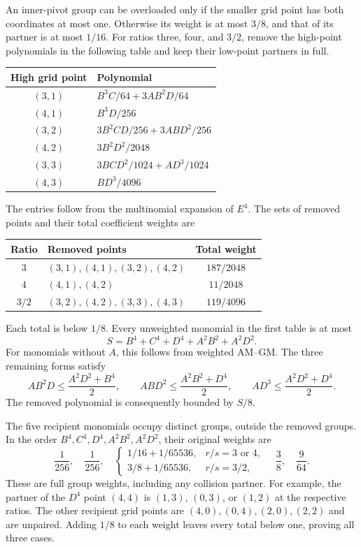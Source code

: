 An inner-pivot group can be overloaded only if the smaller grid point has
both coordinates at most one.  Otherwise its weight is at most $3/8$,
and that of its partner is at most $1/16$.
For ratios three, four, and $3/2$, remove the high-point polynomials in
the following table and keep their low-point partners in full.
\begin{center}
\begin{tabular}{cl}
\toprule
High grid point & Polynomial \\
\midrule
$(3,1)$ & $B^3C/64+3AB^2D/64$ \\
$(4,1)$ & $B^3D/256$ \\
$(3,2)$ & $3B^2CD/256+3ABD^2/256$ \\
$(4,2)$ & $3B^2D^2/2048$ \\
$(3,3)$ & $3BCD^2/1024+AD^3/1024$ \\
$(4,3)$ & $BD^3/4096$ \\
\bottomrule
\end{tabular}
\end{center}
The entries follow from the multinomial expansion of $E^4$.  The sets
of removed points and their total coefficient weights are
\begin{center}
\begin{tabular}{clc}
\toprule
Ratio & Removed points & Total weight \\
\midrule
$3$ & $(3,1),(4,1),(3,2),(4,2)$ & $187/2048$ \\
$4$ & $(4,1),(4,2)$ & $11/2048$ \\
$3/2$ & $(3,2),(4,2),(3,3),(4,3)$ & $119/4096$ \\
\bottomrule
\end{tabular}
\end{center}
Each total is below $1/8$.  Every unweighted monomial in the first table
is at most
\[
 S=B^4+C^4+D^4+A^2B^2+A^2D^2.
\]
For monomials without $A$, this follows from weighted AM--GM.  The three
remaining forms satisfy
\[
 AB^2D\le\frac{A^2D^2+B^4}{2},\qquad
 ABD^2\le\frac{A^2B^2+D^4}{2},\qquad
 AD^3\le\frac{A^2D^2+D^4}{2}.
\]
The removed polynomial is consequently bounded by $S/8$.

The five recipient monomials occupy distinct groups, outside the removed
groups.  In the order $B^4,C^4,D^4,A^2B^2,A^2D^2$, their original
weights are
\[
 \frac1{256},\quad\frac1{256},\quad
 \begin{cases}
  1/16+1/65536,&r/s=3\text{ or }4,\\
  3/8+1/65536,&r/s=3/2,
 \end{cases}
 \quad\frac38,\quad\frac9{64}.
\]
These are full group weights, including any collision partner.  For example,
the partner of the $D^4$ point $(4,4)$ is $(1,3)$, $(0,3)$, or $(1,2)$
at the respective ratios.  The other recipient grid points are
$(4,0),(0,4),(2,0),(2,2)$ and are unpaired.  Adding $1/8$ to each
weight leaves every total below one, proving all three cases.

